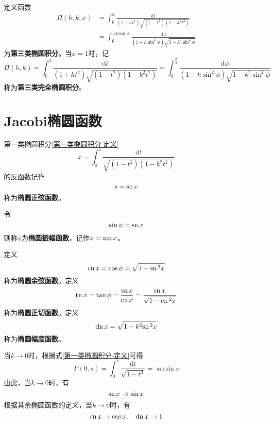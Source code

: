定义函数
\begin{align}
	\varPi(h,k,x) & = \int_0^x \frac{\mathrm{d}t}{(1+ht^2)\sqrt{(1-t^2)(1-k^2t^2)}} \nonumber \\
	& = \int_0^{\arcsin x} \frac{\mathrm{d}\phi}{(1+h\sin^2\phi)\sqrt{1-k^2\sin^2\phi}}
\end{align}
为{\bf 第三类椭圆积分}。当$x=1$时，记
\begin{equation}
	\varPi(h,k) = \int_0^1 \frac{\mathrm{d}t}{(1+ht^2)\sqrt{(1-t^2)(1-k^2t^2)}} = \int_0^{\frac{\pi}{2}} \frac{\mathrm{d}\phi}{(1+h\sin^2\phi)\sqrt{1-k^2\sin^2\phi}}
\end{equation}
称为{\bf 第三类完全椭圆积分}。

\section{Jacobi椭圆函数}

第一类椭圆积分\eqref{第一类椭圆积分-定义}
\begin{equation*}
	x = \int_0^s \frac{\mathrm{d}t}{\sqrt{(1-t^2)(1-k^2t^2)}}
\end{equation*}
的反函数记作
\begin{equation}
	s = \mathrm{sn}\, x
\end{equation}
称为{\bf 椭圆正弦函数}。

令
\begin{equation}
	\sin \phi = \mathrm{sn}\, x
\end{equation}
则称$\phi$为{\bf 椭圆振幅函数}，记作$\phi = \mathrm{am}\, x$。

定义
\begin{equation}
	\mathrm{cn}\, x = \cos \phi = \sqrt{1-\mathrm{sn}\,^2 x}
\end{equation}
称为{\bf 椭圆余弦函数}。定义
\begin{equation}
	\mathrm{tn}\, x = \tan \phi = \frac{\mathrm{sn}\, x}{\mathrm{cn}\, x} = \frac{\mathrm{sn}\, x}{\sqrt{1-\mathrm{cn}\,^2 x}}
\end{equation}
称为{\bf 椭圆正切函数}。定义
\begin{equation}
	\mathrm{dn}\, x = \sqrt{1-k^2\mathrm{sn}\,^2x}
\end{equation}
称为{\bf 椭圆幅度函数}。

当$k\to 0$时，根据式\eqref{第一类椭圆积分-定义}可得
\begin{equation*}
	F(0,s) = \int_0^s \frac{\mathrm{d}t}{\sqrt{1-t^2}} = \arcsin s
\end{equation*}
由此，当$k\to 0$时，有
\begin{equation}
	\mathrm{sn}\, x \to \sin x
\end{equation}
根据其余椭圆函数的定义，当$k\to 0$时，有
\begin{equation}
	\mathrm{cn}\, x \to \cos x,\quad \mathrm{dn}\, x \to 1
\end{equation}
